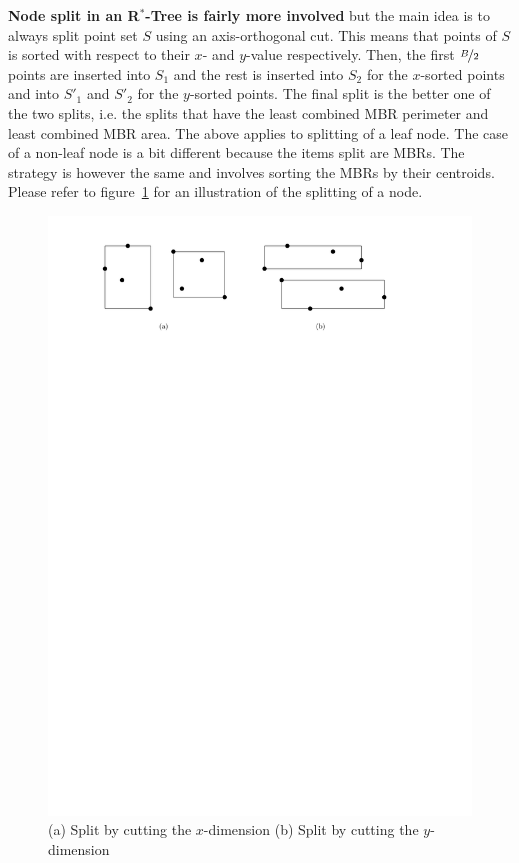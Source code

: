 \documentclass[twoside,11pt,openright]{report}
\begin{document}
\textbf{Node split in an R$^*$-Tree is fairly more involved} but the main idea is to always split point set $S$ using an axis-orthogonal cut. This means that points of $S$ is sorted with respect to their $x$- and $y$-value respectively. Then, the first $\nicefrac{B}{2}$ points are inserted into $S_1$ and the rest is inserted into $S_2$ for the $x$-sorted points and into $S'_1$ and $S'_2$ for the $y$-sorted points. The final split is the better one of the two splits, i.e. the splits that have the least combined MBR perimeter and least combined MBR area. The above applies to splitting of a leaf node. The case of a non-leaf node is a bit different because the items split are MBRs. The strategy is however the same and involves sorting the MBRs by their centroids. Please refer to figure~\ref{fig:r_tree_splitting} for an illustration of the splitting of a node.

\begin{figure}[h]
	\centering
     \includegraphics[width=\textwidth]{../figures/r_tree_splitting}
     \caption{(a) Split by cutting the $x$-dimension (b) Split by cutting the $y$-dimension}
     \label{fig:r_tree_splitting}
\end{figure}
\end{document}
